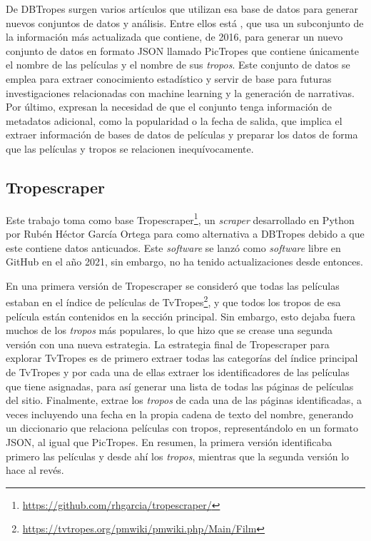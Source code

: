 De DBTropes surgen varios artículos que utilizan esa base de datos para generar
nuevos conjuntos de datos y análisis. Entre ellos está
\cite{garcia2018overview}, que usa un subconjunto de la información más
actualizada que contiene, de 2016, para generar un nuevo conjunto de datos en
formato JSON llamado PicTropes que contiene únicamente el nombre de las
películas y el nombre de sus \textit{tropos}. Este conjunto de datos se emplea
para extraer conocimiento estadístico y servir de base para futuras
investigaciones relacionadas con machine learning y la generación de narrativas.
Por último, expresan la necesidad de que el conjunto tenga información de
metadatos adicional, como la popularidad o la fecha de salida, que implica el
extraer información de bases de datos de películas y preparar los datos de forma
que las películas y tropos se relacionen inequívocamente. 

\subsection{Tropescraper}
Este trabajo toma como base
Tropescraper\footnote{\url{https://github.com/rhgarcia/tropescraper/}}, un
\textit{scraper} desarrollado en Python por Rubén Héctor García Ortega para
\cite{garcia2020startroper} como alternativa a DBTropes debido a que este
contiene datos anticuados. Este \textit{software} se lanzó como
\textit{software} libre en GitHub en el año 2021, sin embargo, no ha tenido
actualizaciones desde entonces.

En una primera versión de Tropescraper se consideró que todas las películas
estaban en el índice de películas de
TvTropes\footnote{\url{https://tvtropes.org/pmwiki/pmwiki.php/Main/Film}}, y que
todos los tropos de esa película están contenidos en la sección principal. Sin
embargo, esto dejaba fuera muchos de los \textit{tropos} más populares, lo que
hizo que se crease una segunda versión con una nueva estrategia. La estrategia
final de Tropescraper para explorar TvTropes es de primero extraer todas las
categorías del índice principal de TvTropes y por cada una de ellas extraer los
identificadores de las películas que tiene asignadas, para así generar una lista
de todas las páginas de películas del sitio. Finalmente, extrae los
\textit{tropos} de cada una de las páginas identificadas, a veces incluyendo una
fecha en la propia cadena de texto del nombre, generando un diccionario que
relaciona películas con tropos, representándolo en un formato JSON, al igual que
PicTropes. En resumen, la primera versión identificaba primero las películas y
desde ahí los \textit{tropos}, mientras que la segunda versión lo hace al revés.

